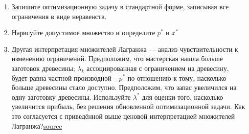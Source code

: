 \documentclass[
  russian,
  letterpaper,
  DIV=11,
  numbers=noendperiod]{scrartcl}
\providecommand{\tightlist}{%
  \setlength{\itemsep}{0pt}\setlength{\parskip}{0pt}}
\begin{document}
\begin{enumerate}
  \begin{enumerate}
  \def\labelenumii{\arabic{enumii}.}
  \tightlist
  \item
    Запишите оптимизационную задачу в стандартной форме, записывая все
    ограничения в виде неравенств.
  \item
    Нарисуйте допустимое множество и определите \(p^*\) и \(x^*\)
  \item
    Другая интерпретация множителей Лагранжа --- анализ чувствительности
    к изменению ограничений. Предположим, что мастерская нашла больше
    заготовок древесины; \(\lambda_k\) ассоциированная с ограничением на
    древесину, будет равна частной производной \(−p^*\) по отношению к
    тому, насколько больше древесины стало доступно. Предположим, что
    запас увеличился на одну заготовку древесины. Используйте
    \(\lambda^*\) для оценки того, насколько увеличится прибыль, без
    решения обновленной оптимизационной задачи. Как это согласуется с
    приведённой выше ценовой интерпретацией множителей
    Лагранжа?\href{https://tleise.people.amherst.edu/Math294Spring2017/TeXfiles/LagrangeDualityHW.pdf}{source}
  \end{enumerate}
\end{enumerate}
\end{document}
